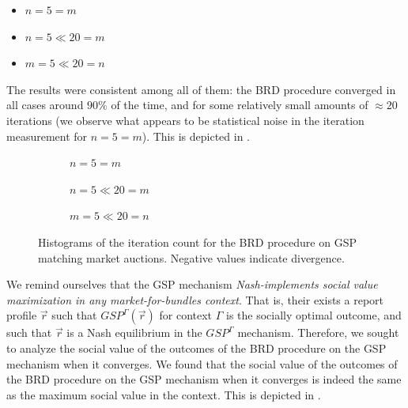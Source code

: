 \documentclass{article}
\begin{document}
\begin{enumerate}[label=(\alph*)]
    \begin{itemize}
        \item $n = 5 = m$
        \item $n = 5 \ll 20 = m$
        \item $m = 5 \ll 20 = n$
    \end{itemize}

    The results were consistent among all of them: the BRD procedure converged in all cases around $90\%$ of the time, and for some relatively small amounts of $\approx 20$ iterations (we observe what appears to be statistical noise in the iteration measurement for $n = 5 = m$). This is depicted in .

    \begin{figure}[ht]
        \centering
        \begin{subfigure}{0.49\textwidth}
            \centering
            \resizebox{\textwidth}{!}{}
            \caption{$n = 5 = m$}
        \end{subfigure}
        \hfill
        \begin{subfigure}{0.49\textwidth}
            \centering
            \resizebox{\textwidth}{!}{}
            \caption{$n = 5 \ll 20 = m$}
        \end{subfigure}

        \vspace{1em} %

        \begin{subfigure}{0.49\textwidth}
            \centering
            \resizebox{\textwidth}{!}{}
            \caption{$m = 5 \ll 20 = n$}
        \end{subfigure}

        \caption{Histograms of the iteration count for the BRD procedure on GSP matching market auctions. Negative values indicate divergence.}
        \label{fig:b2c_convergence}
    \end{figure}
    
    We remind ourselves that the GSP mechanism \textit{Nash-implements social value maximization in any market-for-bundles context}. That is, their exists a report profile $\vec{r}$ such that $GSP^{\Gamma}(\vec{r})$ for context $\Gamma$ is the socially optimal outcome, and such that $\vec{r}$ is a Nash equilibrium in the $GSP^{\Gamma}$ mechanism. Therefore, we sought to analyze the social value of the outcomes of the BRD procedure on the GSP mechanism when it converges. We found that the social value of the outcomes of the BRD procedure on the GSP mechanism when it converges is indeed the same as the maximum social value in the context. This is depicted in .


\end{enumerate}
\end{document}
